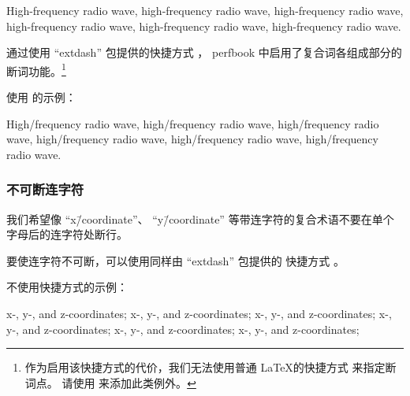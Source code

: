 \begin{center}\begin{minipage}{2.6in}\vspace{0.6\baselineskip}
  High-frequency radio wave, high-frequency radio wave,
  high-frequency radio wave, high-frequency radio wave,
  high-frequency radio wave, high-frequency radio wave.
\vspace{0.6\baselineskip}\end{minipage}\end{center}

通过使用 ``extdash'' 包提供的快捷方式 \qco{\\-/}，
perfbook 中启用了复合词各组成部分的断词功能。\footnote{
  作为启用该快捷方式的代价，我们无法使用普通
  \LaTeX 的快捷方式 \qco{\\-} 来指定断词点。
  请使用  来添加此类例外。
}

使用 \qco{\\-/} 的示例：

\begin{center}\begin{minipage}{2.6in}\vspace{0.6\baselineskip}
  High\-/frequency radio wave, high\-/frequency radio wave,
  high\-/frequency radio wave, high\-/frequency radio wave,
  high\-/frequency radio wave, high\-/frequency radio wave.
\vspace{0.6\baselineskip}\end{minipage}\end{center}

\subsubsection{不可断连字符}
\label{sec:app:styleguide:Non Breakable Hyphen}

我们希望像 ``x\=/coordinate''、
``y\=/coordinate'' 等带连字符的复合术语不要在单个字母后的连字符处断行。

要使连字符不可断，可以使用同样由 ``extdash'' 包提供的
快捷方式 \qco{\\=/}。

不使用快捷方式的示例：

\begin{center}\begin{minipage}{2.55in}\vspace{0.6\baselineskip}
x-, y-, and z-coordinates; x-, y-, and z-coordinates;
x-, y-, and z-coordinates; x-, y-, and z-coordinates;
x-, y-, and z-coordinates; x-, y-, and z-coordinates;
\vspace{0.6\baselineskip}\end{minipage}\end{center}


